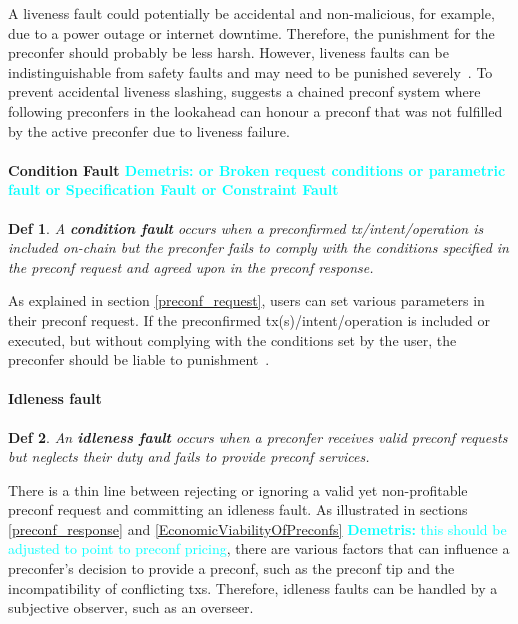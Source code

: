 \documentclass[a4paper]{article}
\theoremstyle{boldstyle}
\newtheorem*{definitionx}{Def}
\newenvironment{definition}
  {\begin{defopenboxq}\begin{definitionx}}
  {\end{definitionx}\end{defopenboxq}}
\newcommand{\dk}[1]{\textcolor{cyan}{\textbf{Demetris:} #1}}
\begin{document}
        A liveness fault could potentially be accidental and non-malicious, for example, due to a power outage or internet downtime. Therefore, the punishment for the preconfer should probably be less harsh. However, liveness faults can be indistinguishable from safety faults and may need to be punished severely~\cite{W:Basedpreconfirmations}. To prevent accidental liveness slashing, \cite{W:AvoidingAccidentalLivenessFaultsforBasedPreconfs} suggests a chained preconf system where following preconfers in the lookahead can honour a preconf that was not fulfilled by the active preconfer due to liveness failure.
        

    \paragraph{Condition Fault \dk{or Broken request conditions or parametric fault or Specification Fault or Constraint Fault}}
        \begin{definition}
            A \textbf{condition fault} occurs when a preconfirmed tx/intent/operation is included on-chain but the preconfer fails to comply with the conditions specified in the preconf request and agreed upon in the preconf response.
        \end{definition}
            
        As explained in section \ref{preconf_request}, users can set various parameters in their preconf request. If the preconfirmed tx(s)/intent/operation is included or executed, but without complying with the conditions set by the user, the preconfer should be liable to punishment~\cite{W:DelegationinBolt:OutsourcingSophisticationWhilePreservingDecentralization}.
        
    \paragraph{Idleness fault}
        \begin{definition}
            An \textbf{idleness fault} occurs when a preconfer receives valid preconf requests but neglects their duty and fails to provide preconf services.
        \end{definition}

        There is a thin line between rejecting or ignoring a valid yet non-profitable preconf request and committing an idleness fault. As illustrated in sections \ref{preconf_response} and \ref{EconomicViabilityOfPreconfs} \dk{this should be adjusted to point to preconf pricing}, there are various factors that can influence a preconfer's decision to provide a preconf, such as the preconf tip and the incompatibility of conflicting txs. Therefore, idleness faults can be handled by a subjective observer, such as an overseer.
\end{document}
